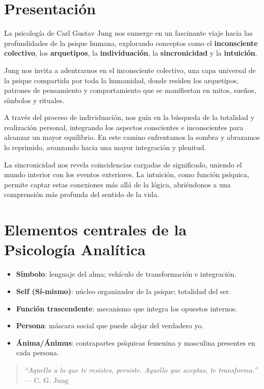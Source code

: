 	\section*{Presentación}

La psicología de Carl Gustav Jung nos sumerge en un fascinante viaje hacia las profundidades de la psique humana, explorando conceptos como el \textbf{inconsciente colectivo}, los \textbf{arquetipos}, la \textbf{individuación}, la \textbf{sincronicidad} y la \textbf{intuición}.

Jung nos invita a adentrarnos en el inconsciente colectivo, una capa universal de la psique compartida por toda la humanidad, donde residen los arquetipos, patrones de pensamiento y comportamiento que se manifiestan en mitos, sueños, símbolos y rituales.

A través del proceso de individuación, nos guía en la búsqueda de la totalidad y realización personal, integrando los aspectos conscientes e inconscientes para alcanzar un mayor equilibrio. En este camino enfrentamos la sombra y abrazamos lo reprimido, avanzando hacia una mayor integración y plenitud.

La sincronicidad nos revela coincidencias cargadas de significado, uniendo el mundo interior con los eventos exteriores. La intuición, como función psíquica, permite captar estas conexiones más allá de la lógica, abriéndonos a una comprensión más profunda del sentido de la vida.

\section*{Elementos centrales de la Psicología Analítica}

\begin{itemize}
	\item \textbf{Símbolo}: lenguaje del alma; vehículo de transformación e integración.
	\item \textbf{Self (Sí-mismo)}: núcleo organizador de la psique; totalidad del ser.
	\item \textbf{Función trascendente}: mecanismo que integra los opuestos internos.
	\item \textbf{Persona}: máscara social que puede alejar del verdadero yo.
	\item \textbf{Ánima/Ánimus}: contrapartes psíquicas femenina y masculina presentes en cada persona.
\end{itemize}

\vspace{0.5cm}
\begin{quote}
	\emph{“Aquello a lo que te resistes, persiste. Aquello que aceptas, te transforma.”} \\ — C. G. Jung
\end{quote}

